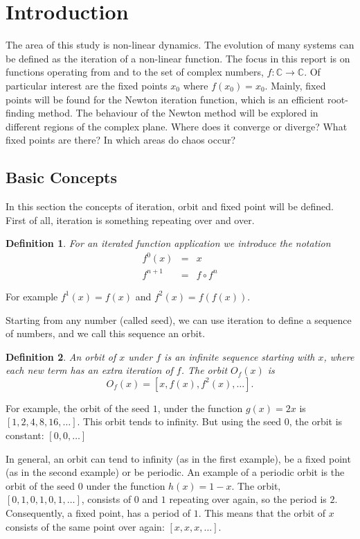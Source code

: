 \newtheorem{definition}{Definition}
\newtheorem{theorem}{Theorem}
\section{Introduction}
The area of this study is non-linear dynamics. The evolution of many systems can be defined as the iteration of a non-linear function. The focus in this report is on functions operating from and to the set of complex numbers, $f:\mathbb{C}\to \mathbb{C}$. Of particular interest are the fixed points $x_0$ where $f(x_0)=x_0$. Mainly, fixed points will be found for the Newton iteration function, which is an efficient root-finding method. The behaviour of the Newton method will be explored in different regions of the complex plane. Where does it converge or  diverge? What fixed points are there? In which areas do chaos occur? 
%
\subsection{Basic Concepts}
In this section the concepts of iteration, orbit and fixed point will be defined. First of all, iteration is something repeating over and over. 
\begin{definition}
For an iterated function application we introduce the notation
\begin{eqnarray*}
f^0(x)     &= &x\\
f^{n+1} &= &f\circ f^n
\end{eqnarray*}
\end{definition}
\noindent 
For example $f^1(x)=f(x)$ and $f^2(x)=f(f(x))$.

Starting from any number (called seed), we can use iteration to define a sequence of numbers, and we call this sequence an orbit.
\begin{definition}
An orbit of $x$ under $f$ is an infinite sequence starting with $x$, where each new term has an extra iteration of $f$. The orbit $O_f(x)$ is \[O_f(x)=[x, f(x), f^2(x),\ldots].\]
\end{definition}
\noindent
For example, the orbit of the seed $1$, under the function $g(x)=2x$ is $[1,2,4,8,16,\ldots]$. This orbit tends to infinity. But using the seed $0$, the orbit is constant: $[0,0,\ldots]$

In general, an orbit can tend to infinity (as in the first example), be a fixed point (as in the second example) or be periodic. An example of a periodic orbit is the orbit of the seed $0$ under the function $h(x)=1-x$. The orbit, $[0,1,0,1,0,1,\ldots]$, consists of $0$ and $1$ repeating over again, so the period is $2$. Consequently, a fixed point, has a period of $1$. This means that the orbit of $x$ consists of the same point over again: $[x, x, x,...]$. 


